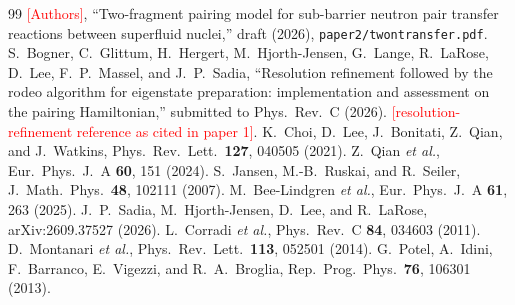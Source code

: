\documentclass[
  aps,
  prc,
  reprint,
  superscriptaddress,
  floatfix,
  nofootinbib
]{revtex4-2}
\newcommand{\todo}[1]{\textcolor{red}{[#1]}}
\begin{document}
\begin{thebibliography}{99}
 \todo{Authors}, ``Two-fragment pairing model for
sub-barrier neutron pair transfer reactions between superfluid nuclei,''
draft (2026), \texttt{paper2/twontransfer.pdf}.
 S.~Bogner, C.~Glittum, H.~Hergert,
M.~Hjorth-Jensen, G.~Lange, R.~LaRose, D.~Lee, F.~P.~Massel, and J.~P.~Sadia,
``Resolution refinement followed by the rodeo algorithm for eigenstate
preparation: implementation and assessment on the pairing Hamiltonian,''
submitted to Phys.\ Rev.\ C (2026).
 \todo{resolution-refinement reference as cited in
paper 1}.
 K.~Choi, D.~Lee, J.~Bonitati, Z.~Qian, and J.~Watkins,
Phys.\ Rev.\ Lett.\ \textbf{127}, 040505 (2021).
 Z.~Qian \emph{et al.}, Eur.\ Phys.\ J.\ A \textbf{60},
151 (2024).
 S.~Jansen, M.-B.~Ruskai, and R.~Seiler, J.\ Math.\
Phys.\ \textbf{48}, 102111 (2007).
 M.~Bee-Lindgren \emph{et al.}, Eur.\ Phys.\ J.\ A
\textbf{61}, 263 (2025).
 J.~P.~Sadia, M.~Hjorth-Jensen, D.~Lee, and R.~LaRose,
arXiv:2609.37527 (2026).
 L.~Corradi \emph{et al.}, Phys.\ Rev.\ C \textbf{84},
034603 (2011).
 D.~Montanari \emph{et al.}, Phys.\ Rev.\ Lett.\
\textbf{113}, 052501 (2014).
\bibitem{Potel2013} G.~Potel, A.~Idini, F.~Barranco, E.~Vigezzi, and
R.~A.~Broglia, Rep.\ Prog.\ Phys.\ \textbf{76}, 106301 (2013).
\end{thebibliography}
\end{document}
